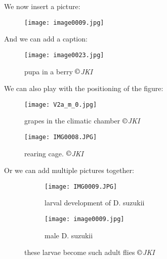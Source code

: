 \documentclass[11pt, a4paper]{article}
\begin{document}
We now insert a picture: %
\begin{figure}[ht!]
\centering
\texttt{[image: image0009.jpg]} %
\end{figure}
\newpage %

And we can add a caption:
\begin{figure}[ht!]
\centering
\texttt{[image: image0023.jpg]} 
\caption{pupa in a berry $\copyright$\textit{JKI}}
\label{picture1} %
\end{figure}

We can also play with the positioning of the figure:
\begin{figure}[ht!]
\texttt{[image: V2a\_m\_0.jpg]} %
\captionsetup{justification=raggedright, singlelinecheck = false} %
\caption{grapes in the climatic chamber $\copyright$\textit{JKI}}
\label{picture2}
\end{figure}
\par

\begin{figure}[ht!]
\texttt{[image: IMG0008.JPG]} %
\captionsetup{justification=raggedleft, singlelinecheck = false} 
\caption{rearing cage. $\copyright$\textit{JKI}}
\label{picture3} 
\end{figure}
\newpage
\par

Or we can add multiple pictures together:
\begin{figure}[ht!]


	\begin{subfigure}{0.5\textwidth}
	\centering
	\texttt{[image: IMG0009.JPG]} 
	\caption{larval development of D. suzukii }
	\label{fig:subim1}
	\end{subfigure}
	\begin{subfigure}{0.5\textwidth}
	\centering
	\texttt{[image: image0009.jpg]}
	\caption{male D. suzukii}
	\label{fig:subim2}
	\end{subfigure}

\caption{these larvae become such adult flies $\copyright$\textit{JKI}}
\label{picture4}
\end{figure}
\par
\end{document}
